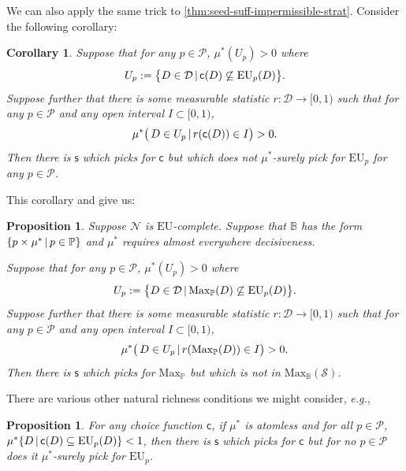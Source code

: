 \documentclass[a4paper,final]{article}
\newtheorem{proposition}[theorem]{Proposition}
\newtheorem{corollary}[theorem]{Corollary}
\renewcommand\P{\mathbb{P}} %
\newcommand\Prob{\mathcal{P}} %
\newcommand\EU{\mathrm{EU}}
\newcommand\Maximality{\mathrm{Max}}
\newcommand{\Decs}{\mathcal{D}}
\renewcommand\S{\mathcal{S}}
\newcommand\s{\mathsf{s}}
\renewcommand\c{\mathsf{c}} %
\newcommand\Nu{\mathcal{N}}
\newcommand{\IB}{\mathbb{B}}
\newcommand{\IP}{\P}
\renewcommand{\color}[1]{}
\newenvironment{colored}[1]{\leavevmode\color{#1}}{}
\newcommand\SetDelimiter[1][]{
	\nonscript\,#1\vert \allowbreak \nonscript\,\mathopen{}}
\providecommand\given{\SetDelimiter}
\newenvironment{CCM rewritten}
{\begingroup\color{blue}} %
{\endgroup}              %
\begin{document}
\begin{colored}{blue}
We can also apply the same trick to \cref{thm:seed-suff-impermissible-strat}. Consider the following corollary:


\begin{corollary}\label{thm:seed-suff-impermissible-strat-corr}
	Suppose that for any $p\in\Prob$, $\mu^*(U_p)>0$ where 
\[
U_p:=\bigl\{D\in\Decs\given \c(D)\not \subseteq\EU_p(D)\bigr\}.
\] 
Suppose further that there is some measurable statistic $r:\Decs\rightarrow[0,1)$ such that for any $p\in\Prob$ and any open interval $I\subset[0,1)$, 
\[
\mu^*\bigl(\,D\in U_p\given r(\c(D))\in I \bigr)>0.
\]
Then there is $\s$ which picks for $\c$ but which does not $\mu^*$-surely pick for $\EU_p$ for any $p\in\Prob$.
\end{corollary}

This corollary and  give us:


\begin{proposition}\label{thm:max-seed-existsimpermissible}
	Suppose $\Nu$ is $\EU$-complete. Suppose that 
	$\IB$ has the form $\{p\times \mu^*\given p\in \IP\}$ and $\mu^*$ requires almost everywhere decisiveness.

Suppose that for any $p\in\Prob$, $\mu^*(U_p)>0$ where 
\[
U_p:=\bigl\{D\in\Decs\given \Maximality_\IP(D)\not \subseteq\EU_p(D)\bigr\}.
\] 
Suppose further that there is some measurable statistic $r:\Decs\rightarrow[0,1)$ such that for any $p\in\Prob$ and any open interval $I\subset[0,1)$, 
\[
\mu^*\bigl(\,D\in U_p\given r(\Maximality_\IP(D))\in I \bigr)>0.
\]
Then there is $\s$ which picks for $\Maximality_\IP$ but which is not in $\Maximality_\IB(\S)$. 
\end{proposition}



There are various other natural richness conditions we might consider, \textit{e.g.},


\begin{proposition}\label{thm:atomless-existsimpermissible}
	For any choice function $\c$, if $\mu^*$ is atomless and for all $p\in\Prob$, $\mu^*\{D\given \c(D)\subseteq\EU_p(D)\}<1$, then there is $\s$ which picks for $\c$ but for no $p\in\Prob$ does it $\mu^*$-surely pick for $\EU_p$. 
\end{proposition}





\end{colored}
\end{document}
